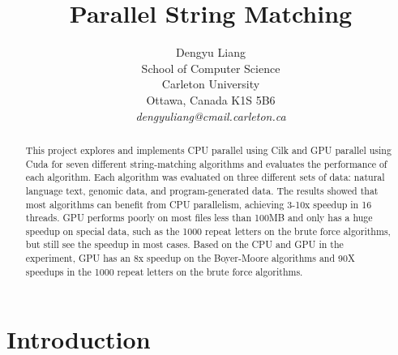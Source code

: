 \documentclass[11pt]{article}       %
\begin{document}


\title{Parallel String Matching}


\author{
Dengyu Liang\\
School of Computer Science\\
Carleton University\\
Ottawa, Canada K1S 5B6\\
{\em dengyuliang@cmail.carleton.ca}
} %

\maketitle

\begin{abstract}
This project explores and implements CPU parallel using Cilk and GPU parallel using Cuda for seven different string-matching algorithms and evaluates the performance of each algorithm. Each algorithm was evaluated on three different sets of data: natural language text, genomic data, and program-generated data. The results showed that most algorithms can benefit from CPU parallelism, achieving 3-10x speedup in 16 threads. GPU performs poorly on most files less than 100MB and only has a huge speedup on special data, such as the 1000 repeat letters on the brute force algorithms, but still see the speedup in most cases.  Based on the CPU and GPU in the experiment, GPU has an 8x speedup on the Boyer-Moore algorithms and 90X speedups in the 1000 repeat letters on the brute force algorithms. 
\end{abstract}

\section{Introduction}
\end{document}
